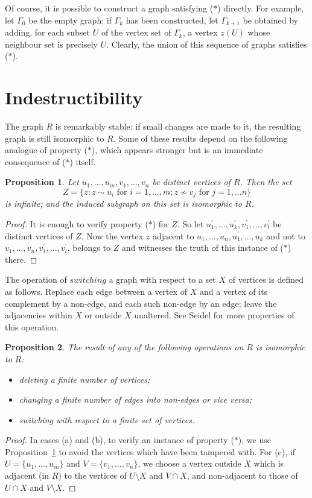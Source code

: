 \documentclass{book}
\newtheorem{proposition}{Proposition}
\begin{document}
Of course, it is possible to construct a graph satisfying ($\ast$)
directly. For example, let $\Gamma_0$ be the empty graph; if
$\Gamma_k$ has been constructed, let $\Gamma_{k+1}$ be obtained by
adding, for each subset $U$ of the vertex set of $\Gamma_k$, a
vertex $z(U)$ whose neighbour set is precisely $U$. Clearly, the
union of this sequence of graphs satisfies ($\ast$).

\section{Indestructibility}%
\label{ch32:sec2.3}

The graph $R$ is remarkably stable: if small changes are made to it,
the resulting graph is still isomorphic to $R$. Some of these
results depend on the following analogue of property ($\ast$), which
appears stronger but is an immediate consequence of ($\ast$) itself.
\begin{proposition}\label{ch32:prop3.1} 
Let $u_1, \ldots, u_m, v_1, \ldots, v_n$ be
distinct vertices of $R$. Then the set
\[
Z = \{z : z\sim u_i\mbox{ for }i = 1,\ldots,m; z\nsim v_j\mbox{ for }j = 1,\ldots n\}
\]
is infinite; and the induced subgraph on this set is isomorphic to
$R$.
\end{proposition}
\begin{proof}
It is enough to verify property ($\ast$) for $Z$. So
let $u_1^{\prime}, \ldots, u_k^{\prime}, v_1^{\prime}, \ldots,
v_l^{\prime}$  be distinct vertices of $Z$. Now the vertex $z$
adjacent to $u_1, \ldots, u_n, u_1^{\prime}, \ldots, u_k^{\prime}$
and not to $v_1, \ldots, v_n, v_1^{\prime}, \ldots, v_l^{\prime}$,
belongs to $Z$ and witnesses the truth of this instance of ($\ast$)
there.
\end{proof}

The operation of $switching$ a graph with respect to a set $X$ of
vertices is defined as follows. Replace each edge between a vertex
of $X$ and a vertex of its complement by a non-edge, and each such
non-edge by an edge; leave the adjacencies within $X$ or outside $X$
unaltered. See Seidel \cite{ch32:bib46} for more properties of this
operation.
\begin{proposition}\label{ch32:prop3.2} 
The result of any of the following operations
on $R$ is isomorphic to $R$:
\begin{itemize}
\item[(a)] deleting a finite number of vertices;
\item[(b)] changing a finite number of edges into non-edges or vice versa;
\item[(c)] switching with respect to a finite set of vertices.
\end{itemize}
\end{proposition}
\begin{proof}
In cases (a) and (b), to verify an instance of
property ($\ast$), we use Proposition~\ref{ch32:prop3.1} to avoid
the vertices which have been tampered with. For (c), if $U
=\{u_1,\ldots,u_m\}$ and $V = \{v_1,\ldots, v_n\}$, we choose a
vertex outside $X$ which is adjacent (in $R$) to the vertices of $U
\setminus X$ and $V \cap X$, and non-adjacent to those of $U\cap X$
and $V \setminus X$.
\end{proof}
\end{document}

